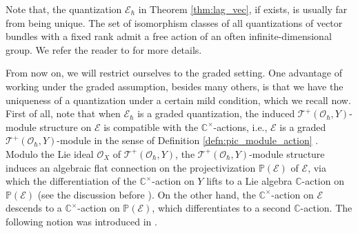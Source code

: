 \documentclass[12pt]{amsart}
\newcommand{\C}{\mathbb{C}}
\newcommand{\F}{\mathcal{F}}
\newcommand{\TT}{\mathscr{T}}
\newcommand{\tatp}{\TT^+(\Q, Y)}
\newcommand{\tat}{\TT(\Q,Y)}
\newcommand{\pic}{\mathscr{PA}}
\newcommand{\cm}{\C^\times}
\newcommand{\OO}{\mathcal{O}}
\newcommand{\Q}{\OO_\hbar}
\newcommand{\EE}{\mathcal{E}}
\newtheorem{Thm}{Theorem}[subsection]
\theoremstyle{definition}
\numberwithin{equation}{section}
\begin{document}

Note that, the quantization $\EE_\hbar$ in Theorem \ref{thm:lag_vec}, if exists, is usually far from being unique. The set of isomorphism classes of all quantizations of vector bundles with a fixed rank admit a free action of an often infinite-dimensional group. We refer the reader to \cite[Thm\,1.1]{BC} for more details.

From now on, we will restrict ourselves to the graded setting. One advantage of working under the graded assumption, besides many others, is that we have the uniqueness of a quantization under a certain mild condition, which we recall now. First of all, note that when $\EE_\hbar$ is a graded quantization, the induced $\tatp$-module structure on $\EE$ is compatible with the $\cm$-actions, i.e., $\EE$ is a graded $\tatp$-module in the sense of Definition \ref{defn:pic_module_action} . Modulo the Lie ideal $\OO_X$ of $\tatp$, the $\tatp$-module structure induces an algebraic flat connection on the projectivization $\mathbb{P}(\EE)$ of $\EE$, via which the differentiation of the $\cm$-action on $Y$ lifts to a Lie algebra $\C$-action on $\mathbb{P}(\EE)$ (see the discussion before \cite[Definition 4.3.2]{LY}). On the other hand, the $\cm$-action on $\EE$ descends to a $\cm$-action on $\mathbb{P}(\EE)$, which differentiates to a second $\C$-action. The following notion was introduced in \cite[Definition 4.3.2]{LY}.
\end{document}
